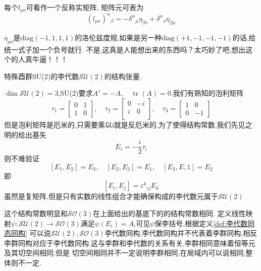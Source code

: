 \documentclass[../main.tex]{subfiles}
\begin{document}
 每个$l_{\mu \nu}$可看作一个反称实矩阵, 矩阵元可表为$$\left(l_{\mu \nu}\right)^{\alpha}{ }_{\beta}=-\delta^{\alpha}{ }_{\mu} \eta_{\beta \nu}+\delta^{\alpha}{ }_{\nu} \eta_{\beta \mu}$$
 \begin{note}
 $\eta_{\mu\nu}$是$\text{diag}(-1,1,1,1)$的洛伦兹度规,如果是另一种$\text{diag}(+1,-1,-1,-1)$的话,给统一式子加一个负号就行.
 不是,这真是人能想出来的东西吗？太巧妙了吧,想出这个的人真牛逼！！！
 \end{note}
 \begin{example}
     特殊酉群SU(2)的李代数$\mathscr{SU}(2)$的结构张量.
 \end{example}
 $\dim\mathscr{SU}(2) = 3$,SU(2)要求$A^\dagger = -A,\quad \operatorname{tr}(A) = 0$.我们有熟知的泡利矩阵
 $$\tau_1 = \begin{bmatrix}
     0&1\\
     1&0
 \end{bmatrix},\quad \tau_2=\begin{bmatrix}
     0&-i\\
     i&0\\
 \end{bmatrix},\quad \tau_3 = \begin{bmatrix}
     1&0\\
     0&-1
 \end{bmatrix}$$但是泡利矩阵是厄米的,只需要乘以i就是反厄米的,为了使得结构常数,我们先见之明的给出基矢
 $$E_i = -\frac{i}{2}\tau_i$$
 则不难验证$$[E_1,E_2] = E_3,\quad [E_2,E_3] = E_1, \quad [E_3,E,1] = E_2$$
 即$$[E_i,E_j] = \varepsilon^k{}_{ij}E_k$$
 虽然是复矩阵,但是只有实数的线性组合才能确保构成的李代数元属于$\mathscr{SU}(2)$

 这个结构常数明显和$\mathscr{SO}(3)$在上面给出的基底下的的结构常数相同.
 定义线性映射$\psi:\mathscr{SU}(2) \rightarrow \mathscr{SO}(3)$满足$\psi(E_i) = A_i$可见$\psi$保李括号,根据定义\ref{def:李代数同态同构}
 可以说$\mathscr{SU}(2),\mathscr{SO}(3)$李代数同构,李代数同构并不代表着李群同构,相反李群同构对应于李代数同构.这与李群和李代数的关系有关,李群相同意味着恒等元及其切空间相同,但是
 切空间相同并不一定说明李群相同,在局域内可以说相同,整体则不一定.
\end{document}

